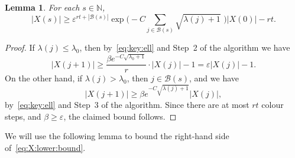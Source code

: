 \documentclass[12pt,reqno]{amsart}
\newtheorem{lemma}[theorem]{Lemma}
\theoremstyle{definition}
\theoremstyle{remark}
\newcommand\N{\mathbb{N}}
\newcommand\cB{\mathcal{B}}
\newcommand\eps{\varepsilon}
\renewcommand{\le}{\leqslant}
\renewcommand{\ge}{\geqslant}
\def\eps{\varepsilon}
\def\N{\mathbb{N}}
\def\cB{\mathcal{B}}
\begin{document}
%
\begin{lemma}
	\label{lem:X:lower:bound}
	For each \(s \in \N\),
	\begin{equation}
		\label{eq:X:lower:bound}
		|X(s)| \ge \eps^{rt + |\cB(s)|} \exp\bigg( - C \sum_{j \in \cB(s)} \sqrt{\lambda(j)+1}\,\, \bigg) |X(0)| - rt.
	\end{equation}
%
\end{lemma}
%
\begin{proof}
	If \(\lambda(j) \le \lambda_0\), then by~\eqref{eq:key:ell} and Step~2 of the algorithm we have
	\begin{equation*}
		|X(j+1)| \ge \frac{\beta e^{- C \sqrt{\lambda_0 + 1}}}{r} \cdot |X(j)| - 1 = \eps |X(j)| - 1.
	\end{equation*}
	On the other hand, if \(\lambda(j) > \lambda_0\), then \(j \in \cB(s)\), and we have
	\begin{equation*}
		|X(j+1)| \ge \beta e^{- C \sqrt{\lambda(j) + 1}} |X(j)|,
	\end{equation*}
	by~\eqref{eq:key:ell} and Step~3 of the algorithm. Since there are at most \(rt\) colour steps, and \(\beta \ge \eps\), the claimed bound follows.
\end{proof}
%

We will use the following lemma to bound the right-hand side of~\eqref{eq:X:lower:bound}.
\end{document}
